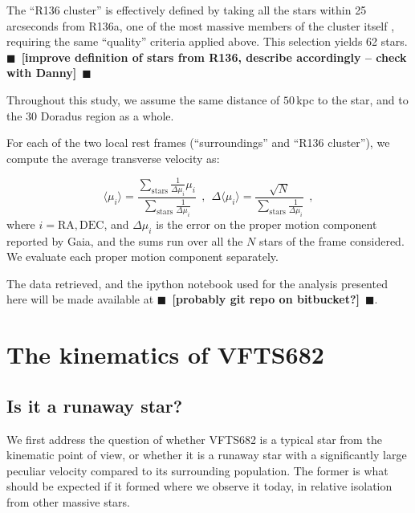 \documentclass{aa}
\newcommand{\todo}[1]{{\large $\blacksquare$~\textbf{\color{red}[#1]}}~$\blacksquare$}
\begin{document}
The ``R136 cluster'' is effectively defined by taking all the stars
within 25 arcseconds from R136a, one of the most massive members of
the cluster itself \citep[][]{crowther:10}, requiring the same
``quality'' criteria applied above. This selection yields 62 stars.
\todo{improve definition
  of stars from R136, describe accordingly -- check with Danny}

Throughout this study, we assume the same distance of $50$\,kpc to the star, and to
the 30 Doradus region as a whole.%

For each of the two local rest frames (``surroundings'' and ``R136
cluster''), we compute the average transverse velocity as:

\begin{equation}
  \label{eq:mean}
  \langle \mu_i\rangle = \frac{\sum_\mathrm{stars}\frac{1}{\Delta
      \mu_i}\mu_i}{\sum_\mathrm{stars} \frac{1}{\Delta \mu_i}} \ \ , \
  \ \Delta \langle \mu_i\rangle = \frac{\sqrt{N}}{\sum_\mathrm{stars}
    \frac{1}{\Delta \mu_i}} \ \ ,
\end{equation}
where $i = \mathrm{RA}, \mathrm{DEC}$, and $\Delta \mu_i$ is the error
on the proper motion component reported by Gaia, and the sums run over
all the $N$ stars of the frame considered. We evaluate each proper motion
component separately. 

The data retrieved, and the ipython notebook used for the analysis
presented here will be made available at \todo{probably git repo on bitbucket?}. 

\section{The kinematics of VFTS682}
\label{sec:results}

\subsection{Is it a runaway star?}
\label{sec:runaway}
We first address the question of whether VFTS682 is a typical star
from the kinematic point of view, or whether it is a runaway star with
a significantly large peculiar velocity compared to its surrounding population. The former is what should
be expected if it formed where we observe it today, in relative
isolation from other massive stars.
\end{document}
